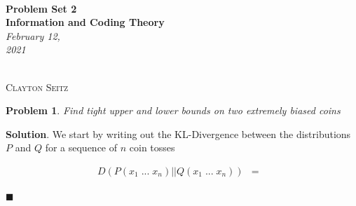 \documentclass[12pt]{article}
\newtheorem{p}{Problem}[section]
\theoremstyle{definition}
\newenvironment{s}{%
        \begin{trivlist} \item \textbf{Solution}. }{%
            \hspace*{\fill} $\blacksquare$\end{trivlist}}%
\begin{document}
{\noindent\Huge\bf  \\[0.5\baselineskip] {\selectfont  Problem Set 2}         }\\[2\baselineskip] %
{ {\bf {}\selectfont Information and Coding Theory}\\ {\textit{\selectfont     February 12, 2021}}}~~~~~~~~~~~~~~~~~~~~~~~~~~~~~~~~~~~~~~~~~~~~~~~~~~~~~~~~~~~~~~~~~~~~~~~~~~~~~    {\large \textsc{Clayton Seitz}
\\[1.4\baselineskip] 

\begin{p}
Find tight upper and lower bounds on two extremely biased coins
\end{p}

\begin{s}
We start by writing out the KL-Divergence between the distributions $P$ and $Q$ for a sequence of $n$ coin tosses

\begin{eqnarray*}
D(P(x_{1} \;...\; x_{n}) || Q(x_{1} \;...\; x_{n})) &=& \\
\end{eqnarray*}

\end{s}
\end{document}

